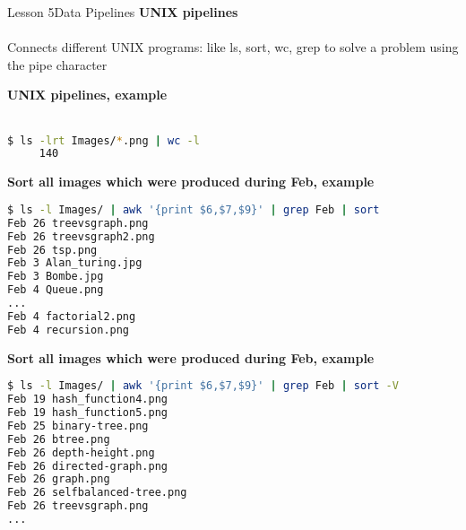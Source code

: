 \documentclass[aspectratio=1610]{beamer}
\begin{document}
\begin{frame}
\end{frame}



\begin{frame}{Lesson 5}{Data Pipelines}
\LARGE
\textbf{UNIX pipelines}\\~\\
Connects different UNIX programs: like ls, sort, wc, grep to solve a problem using the \text{\textbar} pipe character
\end{frame}


\begin{frame}
\end{frame}


\begin{frame}[fragile]
\LARGE
\textbf{UNIX pipelines, example}\\~\\
\begin{lstlisting}[language=sh]
$ ls -lrt Images/*.png | wc -l
     140
\end{lstlisting}
\end{frame}


\begin{frame}[fragile]
\LARGE
\textbf{Sort all images which were produced during Feb, example}\\
\Large
\begin{lstlisting}[language=sh]
$ ls -l Images/ | awk '{print $6,$7,$9}' | grep Feb | sort
Feb 26 treevsgraph.png
Feb 26 treevsgraph2.png
Feb 26 tsp.png
Feb 3 Alan_turing.jpg
Feb 3 Bombe.jpg
Feb 4 Queue.png
...
Feb 4 factorial2.png
Feb 4 recursion.png
\end{lstlisting}
\end{frame}



\begin{frame}[fragile]
\LARGE
\textbf{Sort all images which were produced during Feb, example}\\
\Large
\begin{lstlisting}[language=sh]
$ ls -l Images/ | awk '{print $6,$7,$9}' | grep Feb | sort -V
Feb 19 hash_function4.png
Feb 19 hash_function5.png
Feb 25 binary-tree.png
Feb 26 btree.png
Feb 26 depth-height.png
Feb 26 directed-graph.png
Feb 26 graph.png
Feb 26 selfbalanced-tree.png
Feb 26 treevsgraph.png
...
\end{lstlisting}
\end{frame}
\end{document}
